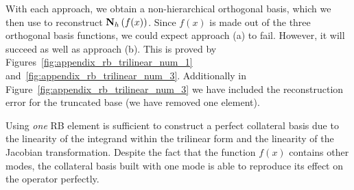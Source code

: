 \documentclass[../../thesis.tex]{subfiles}
\begin{document}
With each approach, we obtain a non-hierarchical orthogonal basis,
which we then use to reconstruct $\vb{N}_h\left(f(x)\right)$.
Since $f(x)$ is made out of the three orthogonal basis functions, 
we could expect approach (a) to fail.
However, it will succeed as well as approach (b).
This is proved by Figures~\ref{fig:appendix_rb_trilinear_num_1} 
and~\ref{fig:appendix_rb_trilinear_num_3}.
Additionally in Figure~\ref{fig:appendix_rb_trilinear_num_3} we have included 
the reconstruction error for the truncated base (we have removed one element). 

Using \textit{one} RB element is sufficient to construct a perfect collateral basis
due to the linearity of the integrand within the trilinear form 
and the linearity of the Jacobian transformation.
Despite the fact that the function $f(x)$ contains other modes, 
the collateral basis built with one mode is able to reproduce its effect on the operator perfectly. 
\end{document}
